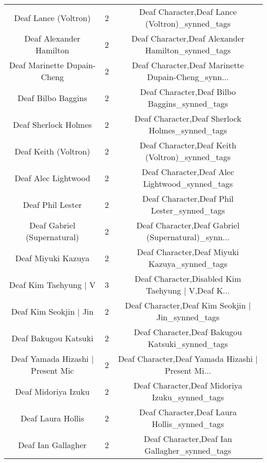 \begin{table}[h!]
{\begin{tabular}{|c|c|c|}
                              Deaf Lance (Voltron) &          2 &    Deaf Character,Deaf Lance (Voltron)\_synned\_tags \\
                           Deaf Alexander Hamilton &          2 & Deaf Character,Deaf Alexander Hamilton\_synned\_tags \\
                       Deaf Marinette Dupain-Cheng &          2 & Deaf Character,Deaf Marinette Dupain-Cheng\_synn... \\
                                Deaf Bilbo Baggins &          2 &      Deaf Character,Deaf Bilbo Baggins\_synned\_tags \\
                              Deaf Sherlock Holmes &          2 &    Deaf Character,Deaf Sherlock Holmes\_synned\_tags \\
                              Deaf Keith (Voltron) &          2 &    Deaf Character,Deaf Keith (Voltron)\_synned\_tags \\
                               Deaf Alec Lightwood &          2 &     Deaf Character,Deaf Alec Lightwood\_synned\_tags \\
                                  Deaf Phil Lester &          2 &        Deaf Character,Deaf Phil Lester\_synned\_tags \\
                       Deaf Gabriel (Supernatural) &          2 & Deaf Character,Deaf Gabriel (Supernatural)\_synn... \\
                                Deaf Miyuki Kazuya &          2 &      Deaf Character,Deaf Miyuki Kazuya\_synned\_tags \\
                             Deaf Kim Taehyung | V &          3 & Deaf Character,Disabled Kim Taehyung | V,Deaf K... \\
                            Deaf Kim Seokjin | Jin &          2 &  Deaf Character,Deaf Kim Seokjin | Jin\_synned\_tags \\
                              Deaf Bakugou Katsuki &          2 &    Deaf Character,Deaf Bakugou Katsuki\_synned\_tags \\
                 Deaf Yamada Hizashi | Present Mic &          2 & Deaf Character,Deaf Yamada Hizashi | Present Mi... \\
                               Deaf Midoriya Izuku &          2 &     Deaf Character,Deaf Midoriya Izuku\_synned\_tags \\
                                 Deaf Laura Hollis &          2 &       Deaf Character,Deaf Laura Hollis\_synned\_tags \\
                                Deaf Ian Gallagher &          2 &      Deaf Character,Deaf Ian Gallagher\_synned\_tags \\

\end{tabular}}
\end{table}
